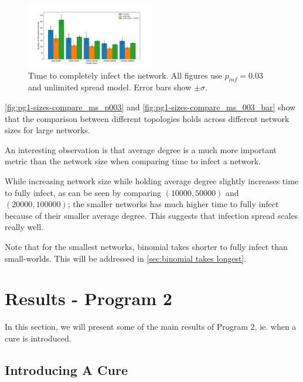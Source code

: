 \documentclass[conference]{IEEEtran}
\begin{document}
\begin{figure}[htb]
  \begin{center}
	\includegraphics[width=0.5\textwidth]{img/pg1-sizes-compare_ms_003_bar.pdf}
  \end{center}
	\caption{Time to completely infect the network. All figures use $p_{inf} = 0.03$ and unlimited spread model. Error bars show $\pm \sigma$.}
	\label{fig:pg1-sizes-compare_ms_003_bar}
\end{figure}

\autoref{fig:pg1-sizes-compare_ms_p003} and \autoref{fig:pg1-sizes-compare_ms_003_bar} show that the comparison between different topologies holds across different network sizes for large networks.

An interesting observation is that average degree is a much more important metric than the network size when comparing time to infect a network.

While increasing network size while holding average degree slightly increases time to fully infect, as can be seen by comparing $(10000,50000)$ and $(20000,100000)$; the smaller networks has much higher time to fully infect because of their smaller average degree. This suggests that infection spread scales really well.

Note that for the smallest networks, binomial takes shorter to fully infect than small-worlds. This will be addressed in \autoref{sec:binomial takes longest}.



\section{Results - Program 2}\label{sec:pg2-res}

In this section, we will present some of the main results of Program 2, ie. when a cure is introduced.

\subsection{Introducing A Cure}
\end{document}
